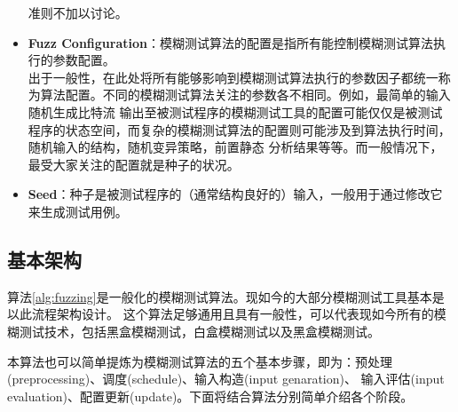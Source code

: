 \documentclass[bachelor]{njupthesis}
\begin{document}
\begin{itemize}
	准则不加以讨论。
	\\ 
	\item \textbf{Fuzz Configuration}：模糊测试算法的配置是指所有能控制模糊测试算法执行的参数配置。
	\\ 出于一般性，在此处将所有能够影响到模糊测试算法执行的参数因子都统一称为算法配置。不同的模糊测试算法关注的参数各不相同。例如，最简单的输入随机生成比特流
	输出至被测试程序的模糊测试工具的配置可能仅仅是被测试程序的状态空间，而复杂的模糊测试算法的配置则可能涉及到算法执行时间，随机输入的结构，随机变异策略，前置静态
	分析结果等等。而一般情况下，最受大家关注的配置就是种子的状况。
	\\ 
	\item \textbf{Seed}：种子是被测试程序的（通常结构良好的）输入，一般用于通过修改它来生成测试用例。
\end{itemize}

\subsection{基本架构}
算法\ref{alg:fuzzing}是一般化的模糊测试算法。现如今的大部分模糊测试工具基本是以此流程架构设计。 
这个算法足够通用且具有一般性，可以代表现如今所有的模糊测试技术，包括黑盒模糊测试，白盒模糊测试以及黑盒模糊测试。

本算法也可以简单提炼为模糊测试算法的五个基本步骤，即为：预处理(preprocessing)、调度(schedule)、输入构造(input genaration)、
输入评估(input evaluation)、配置更新(update)。下面将结合算法分别简单介绍各个阶段。
\end{document}
